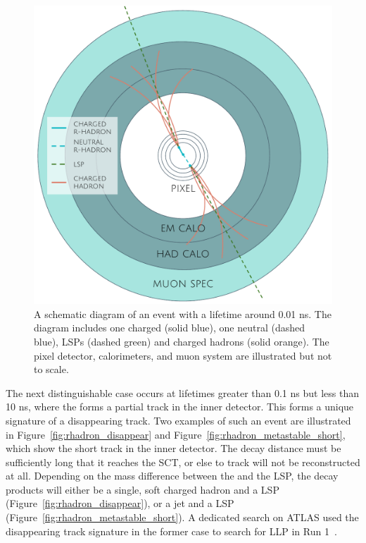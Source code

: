 \begin{figure}[tb]
\centering
\includegraphics[width=\fullfig]{figures/rhadron_displaced.pdf}
\caption{A schematic diagram of an \rhadron event with a lifetime around 0.01 ns. The diagram includes one charged \rhadron (solid blue), one neutral \rhadron (dashed blue), \acp{LSP} (dashed green) and charged hadrons (solid orange). The pixel detector, calorimeters, and muon system are illustrated but not to scale.}
\label{fig:rhadron_displaced}
\end{figure}

The next distinguishable case occurs at lifetimes greater than 0.1 ns but less than 10 ns, where the \rhadron forms a partial track in the inner detector.
This forms a unique signature of a disappearing track.
Two examples of such an event are illustrated in Figure~\ref{fig:rhadron_disappear} and Figure~\ref{fig:rhadron_metastable_short}, which show the short track in the inner detector.
The decay distance must be sufficiently long that it reaches the \ac{SCT}, or else to track will not be reconstructed at all.
Depending on the mass difference between the \rhadron and the \ac{LSP}, the decay products will either be a single, soft charged hadron and a \ac{LSP} (Figure~\ref{fig:rhadron_disappear}), or a jet and a \ac{LSP} (Figure~\ref{fig:rhadron_metastable_short}).
A dedicated search on ATLAS used the disappearing track signature  in the former case to search for \ac{LLP} in Run 1~\cite{SUSY-2013-01}.

